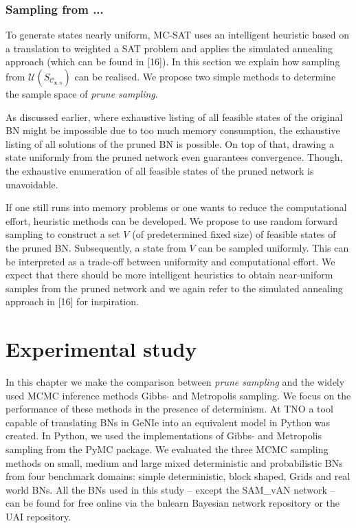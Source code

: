 \documentclass[a4paper, twoside, 11pt]{report}
\theoremstyle{plain}
\theoremstyle{definition}
\theoremstyle{remark}
\newcommand{\C}{{\mathcal C}}
\newcommand{\U}{{\mathcal{U}}}
\newcommand{\bfx}{{\mathbf{x}}}
\begin{document}
\subsection{Sampling from ...}
To generate states nearly uniform, MC-SAT uses an intelligent heuristic based on a translation to weighted a SAT problem and applies the simulated annealing approach (which can be found in [16]). In this section we explain how sampling from $\U(S_{\C_{\bfx,n}})$ can be realised. We propose two simple methods to determine the sample space of \textit{prune sampling}. 

As discussed earlier, where exhaustive listing of all feasible states of the original BN might be impossible due to too much memory consumption, the exhaustive listing of all solutions of the pruned BN is possible. On top of that, drawing a state uniformly from the pruned network even guarantees convergence. Though, the exhaustive enumeration of all feasible states of the pruned network is unavoidable.


If one still runs into memory problems or one wants to reduce the computational effort, heuristic methods can be developed. We propose to use random forward sampling to construct a set $V$ (of predetermined fixed size) of feasible states of the pruned BN. Subsequently, a state from $V$ can be sampled uniformly. This can be interpreted as a trade-off between uniformity and computational effort. We expect that there should be more intelligent heuristics to obtain near-uniform samples from the pruned network and we again refer to the simulated annealing approach in [16] for inspiration.

\chapter{Experimental study}
In this chapter we make the comparison between \textit{prune sampling} and the widely used MCMC inference methods Gibbs- and Metropolis sampling. We focus on the performance of these methods in the presence of determinism. At TNO a tool capable of translating BNs in GeNIe into an equivalent model in Python was created. In Python, we used the implementations of Gibbs- and Metropolis sampling from the PyMC package. We evaluated the three MCMC sampling methods on small, medium and large mixed deterministic and probabilistic BNs from four benchmark domains: simple deterministic, block shaped, Grids and real world BNs. All the BNs used in this study -- except the SAM\_vAN network -- can be found for free online via the bnlearn Bayesian network repository or the UAI repository.
\end{document}
